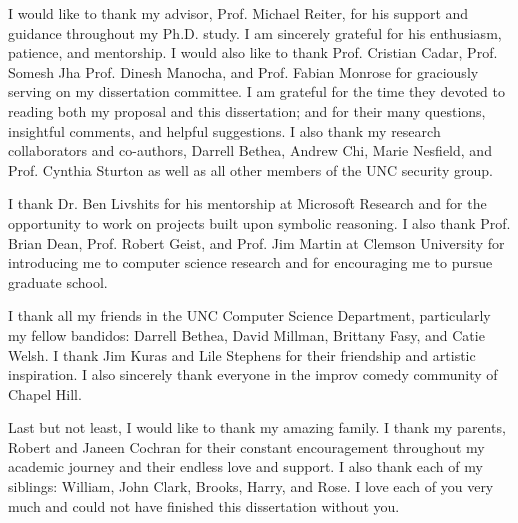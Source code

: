 I would like to thank my advisor, Prof. Michael Reiter, for his support and
guidance throughout my Ph.D. study. I am sincerely grateful for his enthusiasm,
patience, and mentorship. I would also like to thank Prof. Cristian Cadar,
Prof. Somesh Jha Prof. Dinesh Manocha, and Prof. Fabian Monrose for graciously
serving on my dissertation committee. I am grateful for the time they devoted
to reading both my proposal and this dissertation; and for their many
questions, insightful comments, and helpful suggestions. I also
thank my research collaborators and co-authors, Darrell Bethea, Andrew Chi,
Marie Nesfield, and Prof. Cynthia Sturton as well as all other members of the
UNC security group.

I thank Dr. Ben Livshits for his mentorship at Microsoft Research and for the
opportunity to work on projects built upon symbolic reasoning. I also thank
Prof. Brian Dean, Prof. Robert Geist, and Prof. Jim Martin at Clemson
University for introducing me to computer science research and for encouraging
me to pursue graduate school.                                                      

I thank all my friends in the UNC Computer Science Department, particularly my
fellow bandidos: Darrell Bethea, David Millman, Brittany Fasy, and Catie Welsh.
I thank Jim Kuras and Lile Stephens for their friendship and artistic
inspiration.  I also sincerely thank everyone in the improv comedy community of
Chapel Hill.

Last but not least, I would like to thank my amazing family. I thank my
parents, Robert and Janeen Cochran for their constant encouragement throughout
my academic journey and their endless love and support. I also thank each of my
siblings: William, John Clark, Brooks, Harry, and Rose. I love each of you very
much and could not have finished this dissertation without you.

